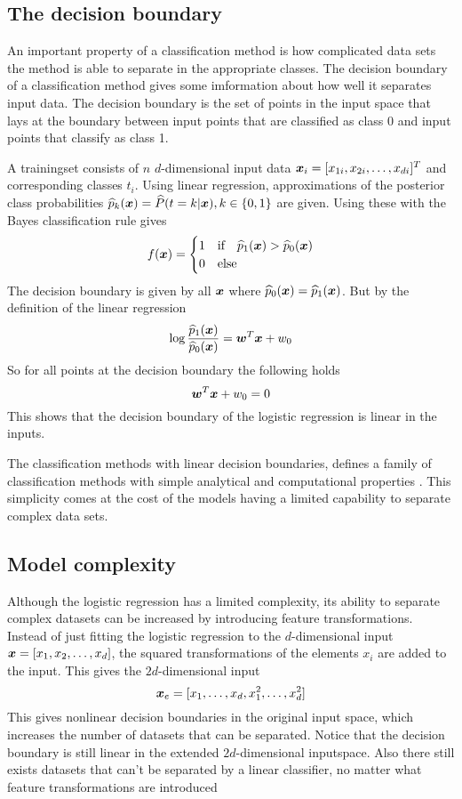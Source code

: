 \subsection{The decision boundary}
An important property of a classification method is how complicated data sets the method is able to separate in the appropriate classes. The decision boundary of a classification method gives some imformation about how well it separates input data. The decision boundary is the set of points in the input space that lays at the boundary between input points that are classified as class 0 and input points that classify as class 1.
\begin{Exa}
    A trainingset consists of $n$ $d$-dimensional input data $\boldsymbol{x}_i=[x_{1i}, x_{2i}, \dots, x_{di}]^T$ and corresponding classes $t_i$. Using linear regression, approximations of the posterior class probabilities $\widehat{p}_k(\boldsymbol{x})=\widehat{P}(t=k|\boldsymbol{x}), k\in\{0,1\}$ are given. Using these with the Bayes classification rule gives
    \[
        f(\boldsymbol{x}) = \begin{cases}
            1 & \text{if}\quad \widehat{p}_1(\boldsymbol{x})>\widehat{p}_0(\boldsymbol{x}) \\
            0 & \text{else}
        \end{cases}
    \]
    The decision boundary is given by all $\boldsymbol{x}$ where $\widehat{p}_0(\boldsymbol{x})=\widehat{p}_1(\boldsymbol{x})$. But by the definition of the linear regression
    \[
        \log\frac{\widehat{p}_1(\boldsymbol{x})}{\widehat{p}_0(\boldsymbol{x})} = \boldsymbol{w}^T\boldsymbol{x}+w_0
    \]
    So for all points at the decision boundary the following holds
    \[
        \boldsymbol{w}^T\boldsymbol{x}+w_0 = 0
    \]
    This shows that the decision boundary of the logistic regression is linear in the inputs.
\end{Exa}
The classification methods with linear decision boundaries, defines a family of classification methods with simple analytical and computational properties \citep[p.179]{bishop}. This simplicity comes at the cost of the models having a limited capability to separate complex data sets. 

\subsection{Model complexity}\label{sec:logistic-complexity}
Although the logistic regression has a limited complexity, its ability to separate complex datasets can be increased by introducing feature transformations. Instead of just fitting the logistic regression to the $d$-dimensional input $\boldsymbol{x}=[x_1, x_2, \dots, x_d]$, the squared transformations of the elements $x_i$ are added to the input. This gives the $2d$-dimensional input 
\[
    \boldsymbol{x}_e = [x_1, \dots, x_d, x_1^2, \dots, x_d^2]
\]
This gives nonlinear decision boundaries in the original input space, which increases the number of datasets that can be separated. Notice that the decision boundary is still linear in the extended $2d$-dimensional inputspace. Also there still exists datasets that can't be separated by a linear classifier, no matter what feature transformations are introduced


